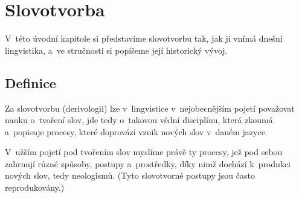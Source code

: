 \hypertarget{slovotvorba}{%
\chapter{Slovotvorba}\label{slovotvorba}}

V~této úvodní kapitole si představíme slovotvorbu tak, jak ji vnímá
dnešní lingvistika, a~ve stručnosti si popíšeme její historický vývoj.

\hypertarget{definice}{%
\section{Definice}\label{definice}}

Za slovotvorbu (derivologii) lze v~lingvistice v~nejobecnějším pojetí
považovat nauku o~tvoření slov, jde tedy o~takovou vědní disciplínu,
která zkoumá a~popisuje procesy, které doprovází vznik nových slov
v~daném jazyce.

V~užším pojetí pod tvořením slov myslíme právě ty procesy, jež pod sebou
zahrnují různé způsoby, postupy a~prostředky, díky nimž dochází
k~produkci nových slov, tedy neologismů. (Tyto slovotvorné postupy jsou
často reprodukovány.)~\parencite[92]{cechova00}
